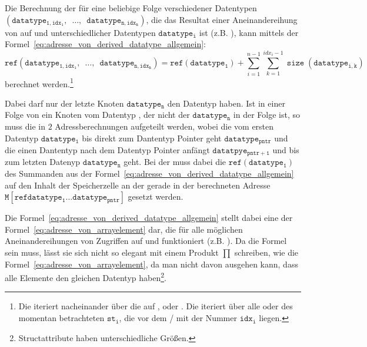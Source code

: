 \begin{Special_Paragraph}
  Die Berechnung der  für eine beliebige Folge verschiedener Datentypen $(\mathtt{datatype_{1, idx_1},\enspace\ldots,\enspace datatype_{n, idx_n}})$, die das Resultat einer Aneinandereihung von  auf  und  unterschiedlicher Datentypen $\mathtt{datatype_{i}}$ ist (z.B. ), kann mittels der Formel~\ref{eq:adresse_von_derived_datatype_allgemein}:
  \begin{equation}
  \mathtt{ref(datatype_{1, idx_1},\enspace\ldots,\enspace datatype_{n, idx_n})} = \mathtt{ref(datatype_1)} + \sum_{i=1}^{n-1}\sum_{k=1}^{idx_i - 1} \mathtt{\operatorname{size}(datatype_{i, k})}
  \label{eq:adresse_von_derived_datatype_allgemein}
  \end{equation}
  berechnet werden.\footnote{Die  iteriert nacheinander über die  auf ,  oder . Die  iteriert über alle  oder  des momentan betrachteten  $\mathtt{st_i}$, die vor dem  /  mit der Nummer $\mathtt{idx_i}$ liegen.}

  Dabei darf nur der letzte Knoten $\mathtt{datatype_n}$ den Datentyp  haben. Ist in einer Folge von   ein Knoten vom Datentyp , der nicht der  $\mathtt{datatype_n}$ in der Folge ist, so muss die  in $2$ Adressberechnungen aufgeteilt werden, wobei die  vom ersten Datentyp $\mathtt{datatype_1}$ bis direkt zum Dantentyp Pointer geht $\mathtt{datatype_{pntr}}$ und die  einen Dantentyp nach dem Datentyp Pointer anfängt $\mathtt{datatpye_{pntr+1}}$ und bis zum letzten Datenyp $\mathtt{datatype_n}$ geht. Bei der  muss dabei die  $\mathtt{ref(datatype_1)}$ des Summanden aus der Formel~\ref{eq:adresse_von_derived_datatype_allgemein} auf den Inhalt der Speicherzelle an der gerade in der  berechneten Adresse $\mathtt{M\left[ref{datatype_1\ldots datatype_{pntr}}\right]}$ gesetzt werden.

  Die Formel~\ref{eq:adresse_von_derived_datatype_allgemein} stellt dabei eine  der Formel~\ref{eq:adresse_von_arrayelement} dar, die für alle möglichen Aneinandereihungen von Zugriffen auf  und  funktioniert (z.B. ). Da die Formel  sein muss, lässt sie sich nicht so elegant mit einem Produkt $\prod$ schreiben, wie die Formel~\ref{eq:adresse_von_arrayelement}, da man nicht davon ausgehen kann, dass alle Elemente den gleichen Datentyp haben\footnote{Structattribute haben unterschiedliche Größen.}.


\end{Special_Paragraph}
